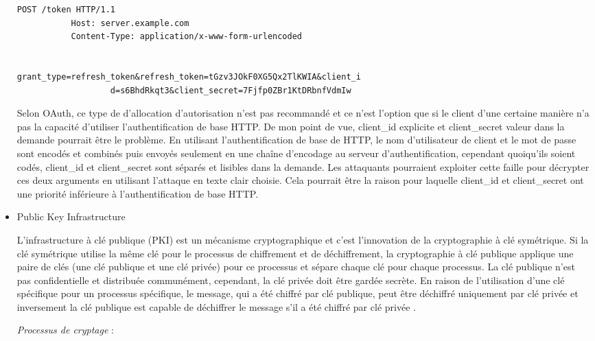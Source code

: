 \begin{itemize}
\begin{verbatim}
POST /token HTTP/1.1
           Host: server.example.com
           Content-Type: application/x-www-form-urlencoded


grant_type=refresh_token&refresh_token=tGzv3JOkF0XG5Qx2TlKWIA&client_i
                   d=s6BhdRkqt3&client_secret=7Fjfp0ZBr1KtDRbnfVdmIw
\end{verbatim}



Selon OAuth, ce type de d'allocation d'autorisation n'est pas recommandé et ce n'est  l'option que si le client d'une certaine manière n'a pas la capacité d'utiliser l'authentification de base HTTP. De mon point de vue, client\_id explicite et client\_secret valeur dans la demande pourrait être le problème. En utilisant l'authentification de base de HTTP, le nom d'utilisateur de client et le mot de passe sont encodés et combinés puis envoyés seulement en une chaîne d'encodage au serveur d'authentification, cependant quoiqu'ils soient codés, client\_id et client\_secret sont séparés et lisibles dans la demande. Les attaquants pourraient exploiter cette faille pour décrypter ces deux arguments en utilisant l'attaque en texte clair choisie. Cela pourrait être la raison pour laquelle client\_id et client\_secret ont une priorité inférieure à l'authentification de base HTTP.
\item Public Key Infrastructure

L'infrastructure à clé publique (PKI) est un mécanisme cryptographique et c'est l'innovation de la cryptographie à clé symétrique. Si la clé symétrique utilise la même clé pour le processus de chiffrement et de déchiffrement, la cryptographie à clé publique applique une paire de clés (une clé publique et une clé privée) pour ce processus et sépare chaque clé pour chaque processus. La clé publique n'est pas confidentielle et distribuée communément, cependant, la clé privée doit être gardée secrète. En raison de l'utilisation d'une clé spécifique pour un processus spécifique, le message, qui a été chiffré par clé publique, peut être déchiffré uniquement par clé privée et inversement la clé publique est capable de déchiffrer le message s'il a été chiffré par clé privée \cite{8}.

\textit{Processus de cryptage} :


\end{itemize}

